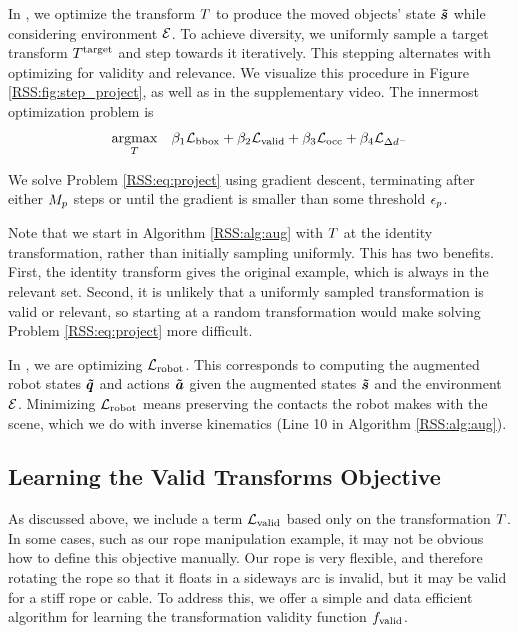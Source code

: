 In \augState{}, we optimize the transform $T$ to produce the moved objects' state $\bm{\Tilde{s}}$ while considering environment $\mathcal{E}$. To achieve diversity, we uniformly sample a target transform $T^\text{target}$ and step towards it iteratively. This stepping alternates with optimizing for validity and relevance. We visualize this procedure in Figure \ref{RSS:fig:step_project}, as well as in the supplementary video. The innermost optimization problem is 
\begin{equation}
    \label{RSS:eq:project}
    \begin{array}{cc}
        \underset{T}{\mathrm{argmax}} & \beta_1\mathcal{L}_\text{bbox}+\beta_2\mathcal{L}_\text{valid}+\beta_3\mathcal{L}_\text{occ}+\beta_4\mathcal{L}_{\Delta{d^-}} \\
    \end{array}
\end{equation}

We solve Problem \eqref{RSS:eq:project} using gradient descent, terminating after either $M_p$ steps or until the gradient is smaller than some threshold $\epsilon_p$.

Note that we start \augState{} in Algorithm \ref{RSS:alg:aug} with $T$ at the identity transformation, rather than initially sampling uniformly. This has two benefits. First, the identity transform gives the original example, which is always in the relevant set. Second, it is unlikely that a uniformly sampled transformation is valid or relevant, so starting at a random transformation would make solving Problem \eqref{RSS:eq:project} more difficult.

In \augRobot{}, we are optimizing $\mathcal{L}_\text{robot}$. This corresponds to computing the augmented robot states $\bm{\Tilde{q}}$ and actions $\bm{\Tilde{a}}$ given the augmented states $\bm{\Tilde{s}}$ and the environment $\mathcal{E}$. Minimizing $\mathcal{L}_\text{robot}$ means preserving the contacts the robot makes with the scene, which we do with inverse kinematics (Line 10 in Algorithm \ref{RSS:alg:aug}).

\subsection{Learning the Valid Transforms Objective}
\label{RSS:sec:learnValid}

As discussed above, we include a term $\mathcal{L}_\text{valid}$ based only on the transformation $T$. In some cases, such as our rope manipulation example, it may not be obvious how to define this objective manually. Our rope is very flexible, and therefore rotating the rope so that it floats in a sideways arc is invalid, but it may be valid for a stiff rope or cable. To address this, we offer a simple and data efficient algorithm for learning the transformation validity function $f_\text{valid}$.

